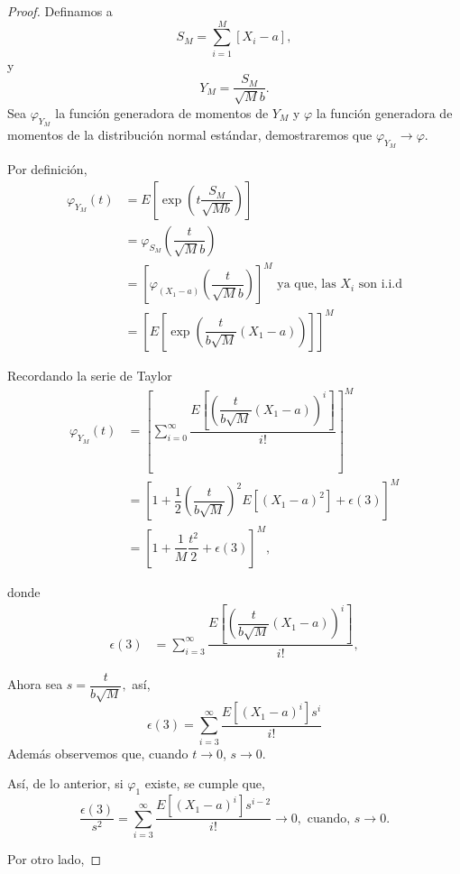 \documentclass[
  letterpaper,
  DIV=11,
  numbers=noendperiod]{scrreprt}
\theoremstyle{plain}
\theoremstyle{definition}
\theoremstyle{remark}
\begin{document}
\begin{proof}

Definamos a \[
S_{M}={\displaystyle \sum_{i=1}^{M}}\left[X_{i}-a\right],
\] y \[
Y_{M}=\dfrac{S_{M}}{\sqrt{M}b}.
\] Sea \(\varphi_{Y_{M}}\) la función generadora de momentos de
\(Y_{M}\) y \(\varphi\) la función generadora de momentos de la
distribución normal estándar, demostraremos que
\(\varphi_{Y_{M}}\to\varphi\).

Por definición, \[
\begin{align*}
\varphi_{Y_{M}}\left(t\right) & =E\left[\exp\left(t\dfrac{S_{M}}{\sqrt{Mb}}\right)\right]\\
& =\varphi_{S_M}\left(\dfrac{t}{\sqrt{M}b}\right)\\
& =\left[\varphi_{\left(X_{1}-a\right)}\left(\dfrac{t}{\sqrt{M}b}\right)\right]^{M} \text{ ya que, las }X_{i}\text{ son i.i.d}\\
& =\left[E\left[\exp\left(\dfrac{t}{b\sqrt{M}}\left(X_{1}-a\right)\right)\right]\right]^{M}
\end{align*}
\]

Recordando la serie de Taylor \[
\begin{align*}
\varphi_{Y_M}\left(t\right) & =\left[\sum_{i=0}^{\infty}\dfrac{E\left[\left(\dfrac{t}{b\sqrt{M}}\left(X_{1}-a\right)\right)^{i}\right]}{i!}\right]^{M}\\
& =\left[1+\dfrac{1}{2}\left(\dfrac{t}{b\sqrt{M}}\right)^{2}E\left[\left(X_{1}-a\right)^{2}\right]+\epsilon\left(3\right)\right]^{M}\\
& =\left[1+\dfrac{1}{M}\dfrac{t^{2}}{2}+\epsilon\left(3\right)\right]^{M},
\end{align*}
\]

donde \[
\begin{align*}
\epsilon\left(3\right) & =\sum_{i=3}^{\infty}\dfrac{E\left[\left(\dfrac{t}{b\sqrt{M}}\left(X_{1}-a\right)\right)^{i}\right]}{i!},
\end{align*}
\]

Ahora sea \(s=\dfrac{t}{b\sqrt{M}},\) así,\\
\[
\epsilon\left(3\right)=\sum_{i=3}^{\infty}\dfrac{E\left[\left(X_{1}-a\right)^{i}\right]s^{i}}{i!}
\] Además observemos que, cuando \(t\to0\), \(s\to0\).

Así, de lo anterior, si \(\varphi_{1}\) existe, se cumple que, \[
\dfrac{\epsilon\left(3\right)}{s^{2}}=\sum_{i=3}^{\infty}\dfrac{E\left[\left(X_{1}-a\right)^{i}\right]s^{i-2}}{i!}\to0,\text{ cuando, }s\to0.
\]

Por otro lado,


\end{proof}
\end{document}
